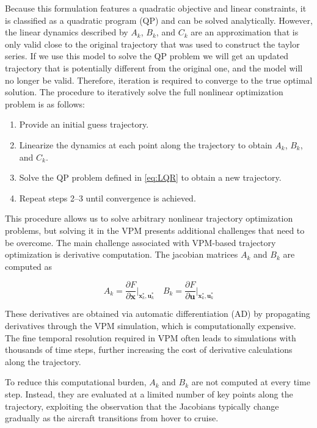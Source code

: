 \documentclass[12pt, letterpaper]{article}
\begin{document}
Because this formulation features a quadratic objective and linear constraints, it is classified as a quadratic program (QP) and can be solved analytically.  However, the linear dynamics described by $A_k$, $B_k$, and $C_k$ are an approximation that is only valid close to the original trajectory that was used to construct the taylor series. If we use this model to solve the QP problem we will get an updated trajectory that is potentially different from the original one, and the model will no longer be valid.  Therefore, iteration is required to converge to the true optimal solution. The procedure to iteratively solve the full nonlinear optimization problem is as follows:  

\begin{enumerate}
    \item Provide an initial guess trajectory.  
    \item Linearize the dynamics at each point along the trajectory to obtain $A_k$, $B_k$, and $C_k$.  
    \item Solve the QP problem defined in \ref{eq:LQR} to obtain a new trajectory.  
    \item Repeat steps 2–3 until convergence is achieved.  
\end{enumerate}

This procedure allows us to solve arbitrary nonlinear trajectory optimization problems, but solving it in the VPM presents additional challenges that need to be overcome.  The main challenge associated with VPM-based trajectory optimization is derivative computation.  The jacobian matrices $A_k$ and $B_k$ are computed as


\begin{equation}
\label{eq:jacobians}
    A_k = \frac{\partial F}{\partial \mathbf{x}} \Big|_{\mathbf{x}_k^*, \mathbf{u}_k^*} \quad B_k = \frac{\partial F}{\partial \mathbf{u}} \Big|_{\mathbf{x}_k^*, \mathbf{u}_k^*}
\end{equation}

These derivatives are obtained via automatic differentiation (AD) by propagating derivatives through the VPM simulation, which is computationally expensive. The fine temporal resolution required in VPM often leads to simulations with thousands of time steps, further increasing the cost of derivative calculations along the trajectory.  

To reduce this computational burden, $A_k$ and $B_k$ are not computed at every time step. Instead, they are evaluated at a limited number of key points along the trajectory, exploiting the observation that the Jacobians typically change gradually as the aircraft transitions from hover to cruise.  
\end{document}

